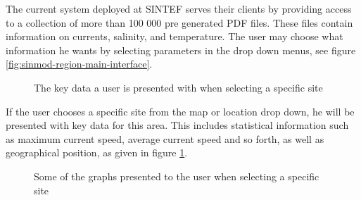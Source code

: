 \documentclass[11pt,a4paper,titlepage,oneside]{report}
\begin{document}
The current system deployed at SINTEF serves their clients by providing access to a collection of more than 100 000 pre generated PDF files. These files contain information on currents, salinity, and temperature. The user may choose what information he wants by selecting parameters in the drop down menus, see figure \ref{fig:sinmod-region-main-interface}.

\begin{figure}[h]
\begin{center}
\caption{The key data a user is presented with when selecting a specific site}
\label{fig:sinmod-site-key-data}
\end{center}
\end{figure}

If the user chooses a specific site from the map or location drop down, he will be presented with key data for this area. This includes statistical information such as maximum current speed, average current speed and so forth, as well as geographical position, as given in figure \ref{fig:sinmod-site-key-data}.


\begin{figure}[h]
\begin{center}
\caption{Some of the graphs presented to the user when selecting a specific site}
\label{fig:sinmod-site-graphs}
\end{center}
\end{figure}
\end{document}
